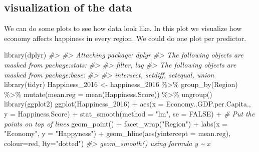 \documentclass[
]{book}
\newenvironment{Shaded}{\begin{snugshade}}{\end{snugshade}}
\newcommand{\AttributeTok}[1]{\textcolor[rgb]{0.77,0.63,0.00}{#1}}
\newcommand{\CommentTok}[1]{\textcolor[rgb]{0.56,0.35,0.01}{\textit{#1}}}
\newcommand{\ConstantTok}[1]{\textcolor[rgb]{0.00,0.00,0.00}{#1}}
\newcommand{\FunctionTok}[1]{\textcolor[rgb]{0.00,0.00,0.00}{#1}}
\newcommand{\NormalTok}[1]{#1}
\newcommand{\OtherTok}[1]{\textcolor[rgb]{0.56,0.35,0.01}{#1}}
\newcommand{\SpecialCharTok}[1]{\textcolor[rgb]{0.00,0.00,0.00}{#1}}
\newcommand{\StringTok}[1]{\textcolor[rgb]{0.31,0.60,0.02}{#1}}
\theoremstyle{definition}
\theoremstyle{definition}
\theoremstyle{definition}
\theoremstyle{definition}
\theoremstyle{remark}
\begin{document}
\hypertarget{visualization-of-the-data}{%
\subsection{visualization of the data}\label{visualization-of-the-data}}

We can do some plots to see how data look like.
In this plot we visualize how economy affects happiness in every region. We could do one plot per predictor.

\begin{Shaded}
\begin{Highlighting}[]
\FunctionTok{library}\NormalTok{(dplyr)}
\CommentTok{\#\textgreater{} }
\CommentTok{\#\textgreater{} Attaching package: \textquotesingle{}dplyr\textquotesingle{}}
\CommentTok{\#\textgreater{} The following objects are masked from \textquotesingle{}package:stats\textquotesingle{}:}
\CommentTok{\#\textgreater{} }
\CommentTok{\#\textgreater{}     filter, lag}
\CommentTok{\#\textgreater{} The following objects are masked from \textquotesingle{}package:base\textquotesingle{}:}
\CommentTok{\#\textgreater{} }
\CommentTok{\#\textgreater{}     intersect, setdiff, setequal, union}
\FunctionTok{library}\NormalTok{(tidyr)}
\NormalTok{Happiness\_2016 }\OtherTok{\textless{}{-}}\NormalTok{ happiness\_2016 }\SpecialCharTok{\%\textgreater{}\%} \FunctionTok{group\_by}\NormalTok{(Region) }\SpecialCharTok{\%\textgreater{}\%} \FunctionTok{mutate}\NormalTok{(}\AttributeTok{mean.reg =} \FunctionTok{mean}\NormalTok{(Happiness.Score)) }\SpecialCharTok{\%\textgreater{}\%}  \FunctionTok{ungroup}\NormalTok{()}
\FunctionTok{library}\NormalTok{(ggplot2)}
\FunctionTok{ggplot}\NormalTok{(Happiness\_2016) }\SpecialCharTok{+} 
  \FunctionTok{aes}\NormalTok{(}\AttributeTok{x =}\NormalTok{ Economy..GDP.per.Capita., }\AttributeTok{y =}\NormalTok{ Happiness.Score) }\SpecialCharTok{+} 
  \FunctionTok{stat\_smooth}\NormalTok{(}\AttributeTok{method =} \StringTok{"lm"}\NormalTok{, }\AttributeTok{se =} \ConstantTok{FALSE}\NormalTok{) }\SpecialCharTok{+}
  \CommentTok{\# Put the points on top of lines}
  \FunctionTok{geom\_point}\NormalTok{() }\SpecialCharTok{+}
  \FunctionTok{facet\_wrap}\NormalTok{(}\StringTok{"Region"}\NormalTok{) }\SpecialCharTok{+}
  \FunctionTok{labs}\NormalTok{(}\AttributeTok{x =} \StringTok{"Economy"}\NormalTok{, }\AttributeTok{y =} \StringTok{"Happyness"}\NormalTok{) }\SpecialCharTok{+}
  \FunctionTok{geom\_hline}\NormalTok{(}\FunctionTok{aes}\NormalTok{(}\AttributeTok{yintercept =}\NormalTok{ mean.reg), }\AttributeTok{colour=}\StringTok{\textquotesingle{}red\textquotesingle{}}\NormalTok{, }\AttributeTok{lty=}\StringTok{"dotted"}\NormalTok{)}
\CommentTok{\#\textgreater{} \textasciigrave{}geom\_smooth()\textasciigrave{} using formula \textquotesingle{}y \textasciitilde{} x\textquotesingle{}}
\end{Highlighting}
\end{Shaded}
\end{document}
